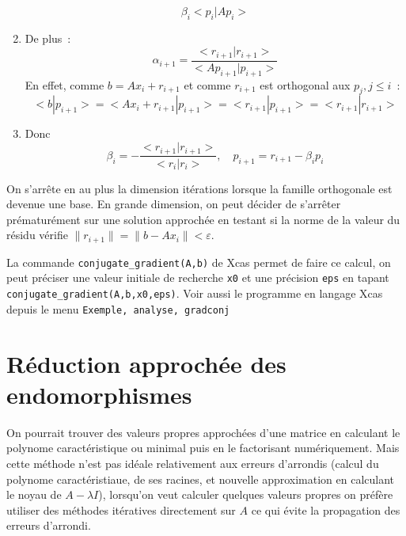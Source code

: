 \documentclass[a4paper,11pt]{book}
\begin{document}
\begin{giacjshere}
\begin{enumerate}
$$\beta_i<p_i|Ap_i>$$
\item De plus~:
$$\alpha_{i+1}=\frac{<r_{i+1}|r_{i+1}>}{<Ap_{i+1}|p_{i+1}>}$$
En effet, comme
$b=Ax_i+r_{i+1}$ et comme $r_{i+1}$ est orthogonal aux $p_j, j \leq i$~:
$$ <b|p_{i+1}>=<Ax_i+r_{i+1}|p_{i+1}>=<r_{i+1}|p_{i+1}>=<r_{i+1}|r_{i+1}>$$
\item Donc 
$$ \beta_i=-\frac{<r_{i+1}|r_{i+1}>}{<r_{i}|r_{i}>},
\quad p_{i+1}=r_{i+1}-\beta_i p_i$$
\end{enumerate}
On s'arr\^ete en au plus la dimension itérations 
lorsque la famille orthogonale est devenue une base. En grande
dimension, on peut d\'ecider de s'arr\^eter pr\'ematur\'ement
sur une solution approch\'ee en testant
si la norme de la valeur du r\'esidu v\'erifie
$\|r_{i+1}\|=\|b-Ax_i\|<\varepsilon$.

La commande \verb|conjugate_gradient(A,b)| de Xcas permet de faire ce
calcul, on peut préciser une valeur initiale de recherche \verb|x0|
et une précision \verb|eps| en tapant 
\verb|conjugate_gradient(A,b,x0,eps)|.
Voir aussi le programme en langage Xcas depuis le 
menu {\tt Exemple, analyse, gradconj}
 
\section{Réduction approchée des endomorphismes}
On pourrait trouver des valeurs propres approchées d'une matrice
en calculant le polynome caractéristique ou minimal puis en le
factorisant numériquement. Mais cette méthode n'est pas idéale
relativement aux erreurs d'arrondis (calcul du polynome caractéristiaue,
de ses racines, et nouvelle approximation en calculant le noyau
de $A-\lambda I$), lorsqu'on veut calculer quelques valeurs propres
on préfère utiliser des méthodes itératives directement sur $A$
ce qui évite la propagation des erreurs d'arrondi.


\end{giacjshere}
\end{document}
